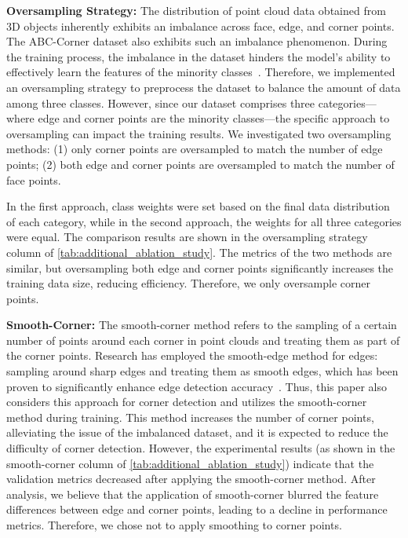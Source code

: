 \documentclass[lettersize,journal]{IEEEtran}
\begin{document}
\textbf{Oversampling Strategy: }
The distribution of point cloud data obtained from 3D objects inherently exhibits an imbalance across face, edge, and corner points. 
The ABC-Corner dataset also exhibits such an imbalance phenomenon. During the training process, the imbalance in the dataset hinders the model's ability to effectively learn the features of the minority classes~\cite{zhang_deep_2023a}.
Therefore, we implemented an oversampling strategy to preprocess the dataset to balance the amount of data among three classes.
However, since our dataset comprises three categories—where edge and corner points are the minority classes—the specific approach to oversampling can impact the training results. We investigated two oversampling methods: (1) only corner points are oversampled to match the number of edge points; (2) both edge and corner points are oversampled to match the number of face points.

In the first approach, class weights were set based on the final data distribution of each category, while in the second approach, the weights for all three categories were equal. The comparison results are shown in the oversampling strategy column of \cref{tab:additional_ablation_study}. The metrics of the two methods are similar, but oversampling both edge and corner points significantly increases the training data size, reducing efficiency. Therefore, we only oversample corner points.

\textbf{Smooth-Corner: }
The smooth-corner method refers to the sampling of a certain number of points around each corner in point clouds and treating them as part of the corner points. Research has employed the smooth-edge method for edges: sampling around sharp edges and treating them as smooth edges, which has been proven to significantly enhance edge detection accuracy~\cite{himeur_pcednet_2022}. Thus, this paper also considers this approach for corner detection and utilizes the smooth-corner method during training.
This method increases the number of corner points, alleviating the issue of the imbalanced dataset, and it is expected to reduce the difficulty of corner detection.
However, the experimental results (as shown in the smooth-corner column of \cref{tab:additional_ablation_study}) indicate that the validation metrics decreased after applying the smooth-corner method.
After analysis, we believe that the application of smooth-corner blurred the feature differences between edge and corner points, leading to a decline in performance metrics. Therefore, we chose not to apply smoothing to corner points.
\end{document}
